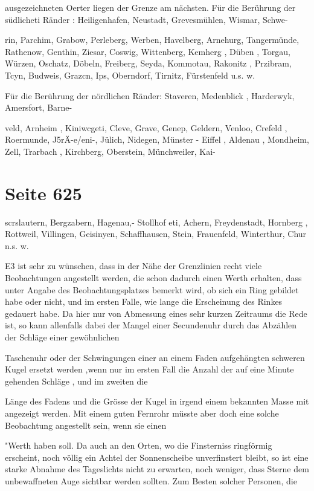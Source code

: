 \documentclass[10pt,a4paper]{article}
\begin{document}
ausgezeichneten Oerter liegen der Grenze am nächsten. Für die Berührung der südlicheti Ränder : Heiligenhafen, Neustadt, Grevesmühlen, Wismar, Schwe-

rin, Parchim, Grabow, Perleberg, Werben, Havelberg, Arnehurg, Tangermünde, Rathenow, Genthin, Ziesar, Coswig, Wittenberg, Kemherg , Düben , Torgau, Würzen, Oschatz, Döbeln, Freiberg, Seyda, Kommotau, Rakonitz , Przibram, Tcyn, Budweis, Grazcn, Ips, Oberndorf, Tirnitz, Fürstenfeld u.s. w.

Für die Berührung der nördlichen Ränder: Staveren, Medenblick , Harderwyk, Amersfort, Barne-

veld, Arnheim , Kiniwcgeti, Cleve, Grave, Genep, Geldern, Venloo, Crefeld , Roermunde, J5rÄ-e/eni-, Jülich, Nidegen, Münster - Eiffel , Aldenau , Mondheim, Zell, Trarbach , Kirchberg, Oberstein, Münchweiler, Kai-


\newpage
\section*{Seite 625}
scrslautern, Bergzabern, Hagenau,- Stollhof eti, Achern, Freydenstadt, Hornberg , Rottweil, Villingen, Geisinyen, Schaffhausen, Stein, Frauenfeld, Winterthur, Chur n.s. w.

E3 ist sehr zu wünschen, dass in der Nähe der Grenzlinien recht viele Beobachtungen angestellt werden, die schon dadurch einen Werth erhalten, dass unter Angabe des Beobachtungsplatzes bemerkt wird, ob sich ein Ring gebildet habe oder nicht, und im ersten Falle, wie lange die Erscheinung des Rinkes gedauert habe. Da hier nur von Abmessung eines sehr kurzen Zeitraums die Rede ist, so kann allenfalls dabei der Mangel einer Secundenuhr durch das Abzählen der Schläge einer gewöhnlichen

Taschenuhr oder der Schwingungen einer an einem Faden aufgehängten schweren Kugel ersetzt werden ,wenn nur im ersten Fall die Anzahl der auf eine Minute gehenden Schläge , und im zweiten die

Länge des Fadens und die Grösse der Kugel in irgend einem bekannten Masse mit angezeigt werden. Mit einem guten Fernrohr müsste aber doch eine solche Beobachtung angestellt sein, wenn sie einen

"Werth haben soll. Da auch an den Orten, wo die Finsterniss ringförmig erscheint, noch völlig ein Achtel der Sonnenscheibe unverfinstert bleibt, so ist eine starke Abnahme des Tageslichts nicht zu erwarten, noch weniger, dass Sterne dem unbewaffneten Auge sichtbar werden sollten. Zum Besten solcher Personen, die
\end{document}
